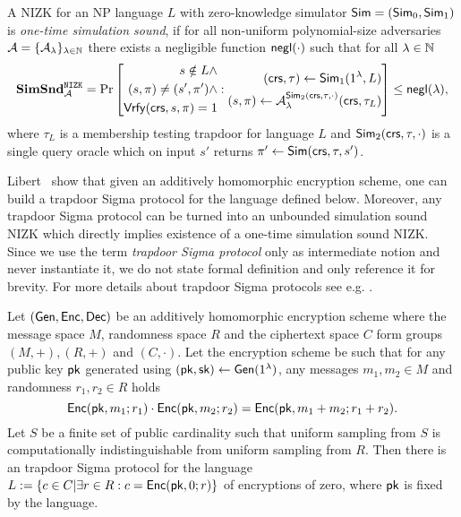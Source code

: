 \begin{definition}\label{def:simsnd}
A NIZK for an NP language $L$ with zero-knowledge simulator $\mathsf{Sim} = (\mathsf{Sim}_0, \mathsf{Sim}_1)$ is \emph{one-time simulation sound}, if for all non-uniform polynomial-size adversaries $\mathcal{A} = \{\mathcal{A}_{\lambda}\}_{\lambda \in \mathbb{N}}$ there exists a negligible function $\mathsf{negl}(\cdot)$ such that for all $\lambda \in \mathbb{N}$ 
\[
\mathbf{SimSnd}_{\mathcal{A}}^{\mathtt{NIZK}} = \Pr\left[
\begin{aligned}
s \notin L \land \\
(s, \pi) \neq (s', \pi') \land \\
\mathsf{Vrfy}(\mathsf{crs}, s, \pi) = 1
\end{aligned}
:
\begin{aligned}
(\mathsf{crs}, \tau) \leftarrow \mathsf{Sim}_1(1{^{\lambda}}, L) \\
(s, \pi) \leftarrow \mathcal{A}_{\lambda}^{\mathsf{Sim}_2(\mathsf{crs}, \tau, \cdot)}(\mathsf{crs}, \tau_L)
\end{aligned} \right] \leq \mathsf{negl}(\lambda),
\]
where $\tau_L$ is a membership testing trapdoor for language $L$ and $\mathsf{Sim}_2(\mathsf{crs}, \tau, \cdot)$ is a single query oracle which on input $s'$ returns $\pi' \leftarrow \mathsf{Sim}(\mathsf{crs}, \tau, s')$.
\end{definition}

Libert~\etal \cite{Libert2021OneShotFN} show that given an additively homomorphic encryption scheme, one can build a trapdoor Sigma protocol for the language defined below. Moreover, any trapdoor Sigma protocol can be turned into an unbounded simulation sound NIZK which directly implies existence of a one-time simulation sound NIZK. Since we use the term \emph{trapdoor Sigma protocol} only as intermediate notion and never instantiate it, we do not state formal definition and only reference it for brevity. For more details about trapdoor Sigma protocols see e.g. \cite{Libert2021OneShotFN}. 

\begin{lemma}\label{lem:tsp}
Let $(\mathsf{Gen}, \mathsf{Enc}, \mathsf{Dec})$ be an additively homomorphic encryption scheme where the message space $M$, randomness space $R$ and the ciphertext space $C$ form groups $(M, +), (R,+)$ and $(C, \cdot)$. Let the encryption scheme be such that for any public key $\mathsf{pk}$ generated using $(\mathsf{pk}, \mathsf{sk}) \leftarrow \mathsf{Gen}(1{^{\lambda}})$, any messages $m_1, m_2 \in M$ and randomness $r_1, r_2 \in R$ holds
\[\mathsf{Enc}(\mathsf{pk}, m_1;r_1) \cdot \mathsf{Enc}(\mathsf{pk}, m_2;r_2) = \mathsf{Enc}(\mathsf{pk}, m_1+m_2; r_1+r_2).\]
Let $S$ be a finite set of public cardinality such that uniform sampling from $S$ is computationally indistinguishable from uniform sampling from $R$. 
Then there is an trapdoor Sigma protocol for the language $L:= \{c \in C| \exists r \in R: c = \mathsf{Enc}(\mathsf{pk}, 0; r)\}$ of encryptions of zero, where $\mathsf{pk}$ is fixed by the language.  
\end{lemma}

